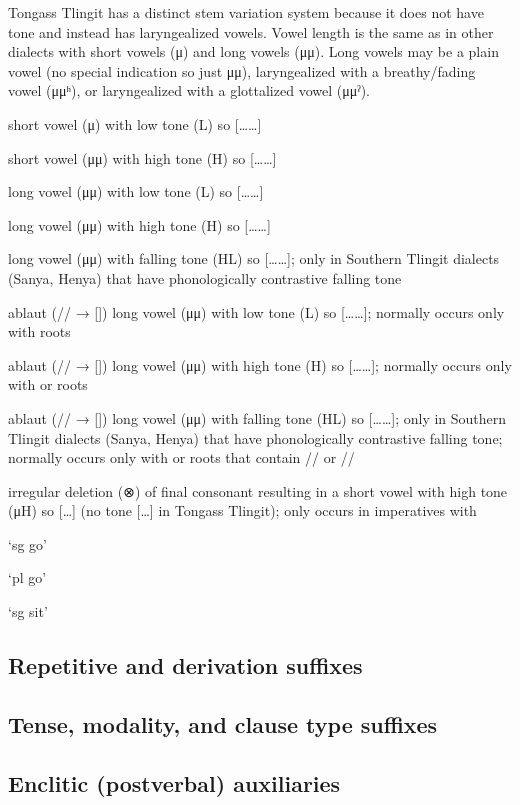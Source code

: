 Tongass Tlingit has a distinct stem variation system because it does not have tone
and instead has laryngealized vowels.
Vowel length is the same as in other dialects with short vowels (μ) and long vowels (μμ).
Long vowels may be a plain vowel (no special indication so just μμ),
laryngealized with a breathy/fading vowel (μμʰ),
or laryngealized with a glottalized vowel (μμˀ).

\begin{morphdesc}
\item[\X{-μL}]
	short vowel (μ) with low tone (L) so [……]

\item[\X{-μH}]
	short vowel (μμ) with high tone (H) so [……]

\item[\X{-μμL}]
	long vowel (μμ) with low tone (L) so [……]

\item[\X{-μμH}]
	long vowel (μμ) with high tone (H) so [……]

\item[\X{-μμHL}]
	long vowel (μμ) with falling tone (HL) so [……];
	only in Southern Tlingit dialects (Sanya, Henya) that have phonologically
		contrastive falling tone

\item[\X{-μᵉμL}]
	ablaut (// → []) long vowel (μμ)
		with low tone (L) so [……];
	normally occurs only with  roots

\item[\X{-μᵉμH}]
	ablaut (// → []) long vowel (μμ)
		with high tone (H) so [……];
	normally occurs only with  or  roots

\item[\X{-μᵉμHL}]
	ablaut (// → []) long vowel (μμ)
		with falling tone (HL) so [……];
	only in Southern Tlingit dialects (Sanya, Henya) that have phonologically
		contrastive falling tone;
	normally occurs only with  or  roots
		that contain // or //

\item[{\X[-DEL]{-⊗}}]
	irregular deletion (⊗) of final consonant
		resulting in a short vowel with high tone (μH)
		so […]
		(no tone […] in Tongass Tlingit);
	only occurs in imperatives with
		\begin{inlinelist}
		\item	{} ‘sg go’
		\item	{} ‘pl go’
		\item	{} ‘sg sit’
		\end{inlinelist}
\end{morphdesc}

\subsection{Repetitive and derivation suffixes}\label{sec:inventory-repderiv}

\subsection{Tense, modality, and clause type suffixes}\label{sec:inventory-tmc}

\subsection{Enclitic (postverbal) auxiliaries}\label{sec:inventory-aux}
